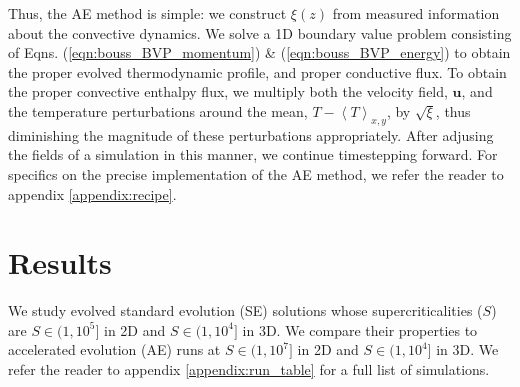 \documentclass[aps, pre, onecolumn, nofootinbib, notitlepage, groupedaddress, amsfonts, amssymb, amsmath, longbibliography]{revtex4-1}
\newcommand{\angles}[1]{\ensuremath{\left\langle #1 \right\rangle}}
\begin{document}
Thus, the AE method is simple: we construct $\xi(z)$ from measured information about
the convective dynamics. We solve a 1D boundary value problem consisting of
Eqns. (\ref{eqn:bouss_BVP_momentum}) \& (\ref{eqn:bouss_BVP_energy})
to obtain the proper evolved thermodynamic profile, and proper conductive flux.
To obtain the proper convective enthalpy flux, we multiply both the velocity field,
$\bm{u}$, and the temperature perturbations around the mean, $T - \angles{T}_{x,y}$,
by $\sqrt{\xi}$, thus diminishing the magnitude of these perturbations appropriately.
After adjusing the fields of a simulation in this manner, we continue timestepping forward.
For specifics on the precise implementation of the AE method, we refer
the reader to appendix \ref{appendix:recipe}.


\section{Results}
\label{sec:results}
We study evolved standard evolution (SE) solutions whose supercriticalities ($S$) are 
$S \in (1, 10^5]$ in 2D and $S \in (1, 10^4]$ in
3D. We compare their properties to
accelerated evolution (AE) runs at $S \in (1, 10^7]$ in 2D and
$S \in (1, 10^4]$ in 3D.
We refer the reader to appendix \ref{appendix:run_table} for a full list of
simulations.
\end{document}
